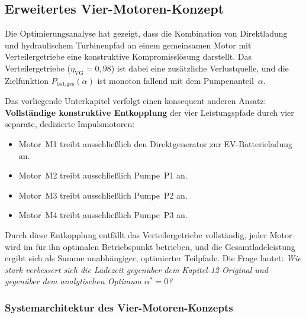 ﻿\documentclass[a4paper,12pt]{article}
\begin{document}
\subsection{Erweitertes Vier-Motoren-Konzept}
\label{sec:vier_motoren}

Die Optimierungsanalyse hat gezeigt, dass die Kombination von Direktladung und hydraulischem
Turbinenpfad an einem gemeinsamen Motor mit Verteilergetriebe eine
konstruktive Kompromisslösung darstellt. Das Verteilergetriebe
($\eta_\text{VG} = 0{,}98$) ist dabei eine zusätzliche Verlustquelle,
und die Zielfunktion $P_\text{bat,ges}(\alpha)$ ist monoton fallend
mit dem Pumpenanteil~$\alpha$.

Das vorliegende Unterkapitel verfolgt einen konsequent anderen Ansatz:
\textbf{Vollständige konstruktive Entkopplung} der vier Leistungspfade
durch vier separate, dedizierte Impulsmotoren:

\begin{itemize}
  \item Motor~M1 treibt ausschließlich den Direktgenerator zur
    EV-Batterieladung an.
  \item Motor~M2 treibt ausschließlich Pumpe~P1 an.
  \item Motor~M3 treibt ausschließlich Pumpe~P2 an.
  \item Motor~M4 treibt ausschließlich Pumpe~P3 an.
\end{itemize}

Durch diese Entkopplung entfällt das Verteilergetriebe vollständig,
jeder Motor wird im für ihn optimalen Betriebspunkt betrieben, und die
Gesamtladeleistung ergibt sich als Summe unabhängiger, optimierter
Teilpfade. Die Frage lautet: \textit{Wie stark verbessert sich die
Ladezeit gegenüber dem Kapitel-12-Original und gegenüber dem
analytischen Optimum $\alpha^* = 0$?}

\subsubsection{Systemarchitektur des Vier-Motoren-Konzepts}
\end{document}
